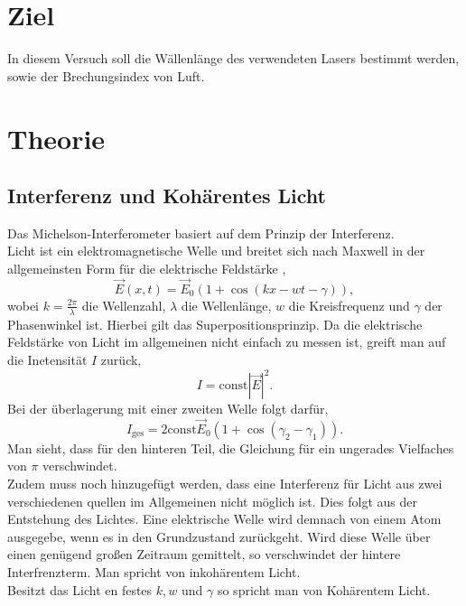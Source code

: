 \section{Ziel}
In diesem Versuch soll die Wällenlänge des verwendeten Lasers bestimmt werden, sowie der Brechungsindex von Luft.
\section{Theorie}
\subsection{Interferenz und Kohärentes Licht}
Das Michelson-Interferometer basiert auf dem Prinzip der Interferenz.\\
Licht ist ein elektromagnetische Welle und breitet sich nach Maxwell in der allgemeinsten Form für die elektrische Feldstärke ,
\begin{equation}
    \vec{E}(x,t)=\vec{E}_0\left(1+\cos (kx-wt-\gamma)\right), \nonumber
\end{equation}
wobei $k=\frac{2\pi}{\lambda}$ die Wellenzahl, $\lambda$ die Wellenlänge, $w$ die Kreisfrequenz und $\gamma$ der Phasenwinkel ist.
Hierbei gilt das Superpositionsprinzip. Da die elektrische Feldstärke von Licht im allgemeinen nicht 
einfach zu messen ist, greift man auf die Inetensität $I$ zurück,
\begin{equation}
    I=\text{const}|\vec{E}|^2. \nonumber
\end{equation}
Bei der überlagerung mit einer zweiten Welle folgt darfür,
\begin{equation}
    I_{\text{ges}}=2\text{const}\vec{E}_0(1+\cos (\gamma_2-\gamma_1)). \nonumber
\end{equation}
Man sieht, dass für den hinteren Teil, die Gleichung für ein ungerades Vielfaches von $\pi$ verschwindet.\\

Zudem muss noch hinzugefügt werden, dass eine Interferenz für Licht aus zwei verschiedenen quellen im Allgemeinen nicht möglich ist.
Dies folgt aus der Entstehung des Lichtes. Eine elektrische Welle wird demnach von einem Atom ausgegebe, wenn es in den Grundzustand zurückgeht.
Wird diese Welle über einen genügend großen Zeitraum gemittelt, so verschwindet der hintere Interfrenzterm.
Man spricht von inkohärentem Licht.\\
Besitzt das Licht en festes $k, w$ und $\gamma$ so spricht man von Kohärentem Licht.\\


